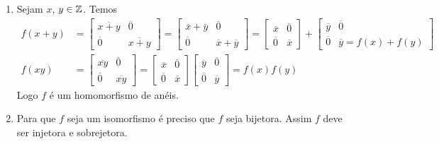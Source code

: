 \documentclass[12pt]{exam}
\begin{document}
    \solucao
    \begin{enumerate}[label=({\alph*})]
        \item Sejam $x$, $y \in \mathbb{Z}$. Temos
        \begin{align*}
            f(x + y) &= \begin{bmatrix}
                \overline{x + y} & \overline{0}\\
                \overline{0} & \overline{x + y}
            \end{bmatrix} = \begin{bmatrix}
            \overline{x} + \overline{y} & \overline{0}\\
            \overline{0} & \overline{x} + \overline{y}
            \end{bmatrix} = \begin{bmatrix}
            \overline{x} & \overline{0}\\
            \overline{0} & \overline{x}
            \end{bmatrix} + \begin{bmatrix}
            \overline{y} & \overline{0}\\
            \overline{0} & \overline{y} = f(x) + f(y)
            \end{bmatrix}\\
            f(xy) &= \begin{bmatrix}
                \overline{xy} & \overline{0}\\
                \overline{0} & \overline{xy}
            \end{bmatrix} =
            \begin{bmatrix}
                \overline{x} & \overline{0}\\
                \overline{0} & \overline{x}
            \end{bmatrix}\begin{bmatrix}
                \overline{y} & \overline{0}\\
                \overline{0} & \overline{y}
            \end{bmatrix} = f(x)f(y)
        \end{align*}
        Logo $f$ é um homomorfismo de anéis.

        \item Para que $f$ seja um isomorfismo é preciso que $f$ seja bijetora. Assim $f$ deve ser injetora e sobrejetora.


\end{enumerate}
\end{document}
